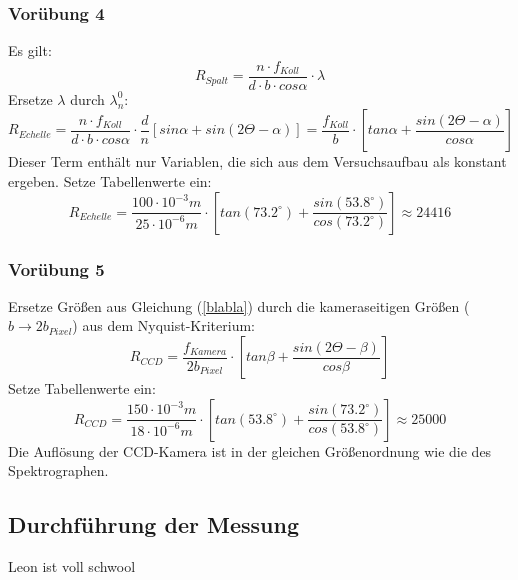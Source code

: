 \subsubsection{Vorübung 4}
Es gilt:
\begin{equation}
R_{Spalt} = \frac{n\cdot f_{Koll}}{d\cdot b\cdot cos \alpha}\cdot \lambda
\end{equation}
Ersetze $\lambda$ durch $\lambda_n^0$:
\begin{equation}
R_{Echelle} = \frac{n\cdot f_{Koll}}{d\cdot b\cdot cos \alpha}\cdot \frac{d}{n}[sin \alpha + sin(2\Theta-\alpha)] = \frac{f_{Koll}}{b}\cdot [tan \alpha + \frac{sin(2\Theta-\alpha)}{cos \alpha}]
\label{blabla}
\end{equation}
Dieser Term enthält nur Variablen, die sich aus dem Versuchsaufbau als konstant ergeben. 
Setze Tabellenwerte ein:
\begin{equation}
R_{Echelle} = \frac{100 \cdot 10^{-3}m}{25 \cdot 10^{-6}m}\cdot [tan (73.2^{\circ}) + \frac{sin(53.8^{\circ})}{cos (73.2^{\circ})}] \approx 24416
\end{equation}

\subsubsection{Vorübung 5}
Ersetze Größen aus Gleichung (\ref{blabla}) durch die kameraseitigen Größen ($b \rightarrow 2b_{Pixel}$) aus dem Nyquist-Kriterium:
\begin{equation}
R_{CCD} = \frac{f_{Kamera}}{2b_{Pixel}}\cdot [tan \beta + \frac{sin(2\Theta-\beta)}{cos \beta}]
\end{equation}
Setze Tabellenwerte ein:
\begin{equation}
R_{CCD} = \frac{150\cdot10^{-3}m}{18\cdot10^{-6}m}\cdot [tan (53.8^{\circ}) + \frac{sin(73.2^{\circ})}{cos (53.8^{\circ})}] \approx 25000
\end{equation}
Die Auflösung der CCD-Kamera ist in der gleichen Größenordnung wie die des Spektrographen. 



\subsection{Durchführung der Messung}
Leon ist voll schwool

